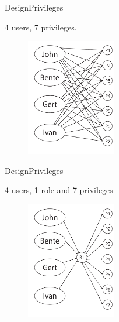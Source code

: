 \begin{frame}{Design}{Privileges}
  \begin{block}{}
  	4 users, 7 privileges. 

  	\begin{figure}[htb]
    	\centering
    	\includegraphics[width=0.35\textwidth]{images/privileges2.pdf}
  	\end{figure}
  \end{block}
\end{frame}

\begin{frame}{Design}{Privileges}
  \begin{block}{}
  	4 users, 1 role and 7 privileges

  	\begin{figure}[htb]
    	\centering
    	\includegraphics[width=0.35\textwidth]{images/privileges3.pdf}
  	\end{figure}
  \end{block}
\end{frame}

